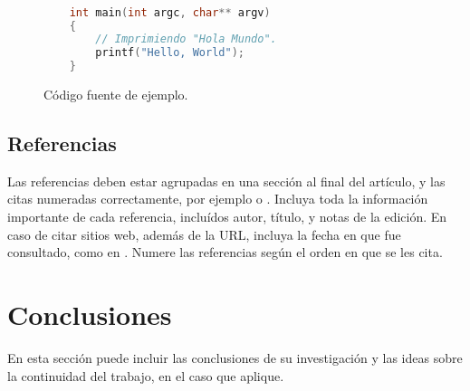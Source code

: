 \documentclass[a4paper,10pt,twocolumn]{article}
\begin{document}

		\begin{figure}[htb]%
			\begin{lstlisting}[language=c]%

    int main(int argc, char** argv)
    {
        // Imprimiendo "Hola Mundo".
        printf("Hello, World");
    }

			\end{lstlisting}
		\caption{Código fuente de ejemplo.\label{fig:code}}
		\end{figure}

	\subsection{Referencias}
  	Las referencias deben estar agrupadas en una sección al final del artículo,
  	y las citas numeradas correctamente, por ejemplo \cite{knuth} o \cite{goedel}.
  	Incluya toda la información importante de cada referencia, incluídos autor,
  	título, y notas de la edición. En caso de citar sitios web, además
  	de la URL, incluya la fecha en que fue consultado, como en \cite{wiki}. Numere 
  	las referencias según el orden en que se les cita.




\section{Conclusiones}\label{sec:conc}

  En esta sección puede incluir las conclusiones de su investigación y las ideas
  sobre la continuidad del trabajo, en el caso que aplique.




\end{document}
